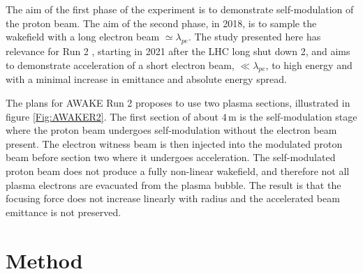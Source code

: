 \documentclass[aps,prstab,reprint,amsmath,amssymb,groupedaddress]{revtex4-1}
\newcommand{\unit}[1]{\,\mathrm{#1}}
\begin{document}
The aim of the first phase of the experiment is to demonstrate self-modulation of the proton beam. The aim of the second
phase, in 2018, is to sample the wakefield with a long electron beam $\simeq\lambda_{pe}$. The study presented here has
relevance for Run 2 \cite{adli:2016}, starting in 2021 after the LHC long shut down 2, and aims to demonstrate
acceleration of a short electron beam, $\ll\lambda_{pe}$, to high energy and with a minimal increase in emittance and
absolute energy spread.

The plans for AWAKE Run 2 proposes to use two plasma sections, illustrated in figure \ref{Fig:AWAKER2}. The first
section of about $4\unit{m}$ is the self-modulation stage where the proton beam undergoes self-modulation without the
electron beam present. The electron witness beam is then injected into the modulated proton beam before section two
where it undergoes acceleration. The self-modulated proton beam does not produce a fully non-linear wakefield, and
therefore not all plasma electrons are evacuated from the plasma bubble. The result is that the focusing force does not
increase linearly with radius and the accelerated beam emittance is not preserved. 




\section[\label{S:M}]{Method}
\end{document}
